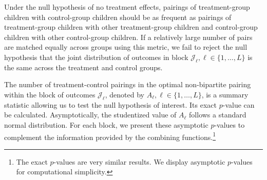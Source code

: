 Under the null hypothesis of no treatment effects, pairings of treatment-group children with control-group children should be as frequent as pairings of treatment-group children with other treatment-group children and control-group children with other control-group children. If a relatively large number of pairs are matched equally across groups using this metric, we fail to reject the null hypothesis that the joint distribution of outcomes in block $\mathcal{J}_{\ell}, \ell \in \{1,\dots ,L\}$ is the same across the treatment and control groups.

The number of treatment-control pairings in the optimal non-bipartite pairing within the block of outcomes $\mathcal{J}_\ell$, denoted by $A_{\ell}, \ell \in \{1,\dots ,L\}$, is a summary statistic allowing us to test the null hypothesis of interest. Its exact $p$-value can be calculated. Asymptotically, the studentized value of $A_\ell$ follows a standard normal distribution. For each block, we present these asymptotic $p$-values to complement the information provided by the combining functions.\footnote{The exact $p$-values are very similar results. We display asymptotic $p$-values for computational simplicity.}
